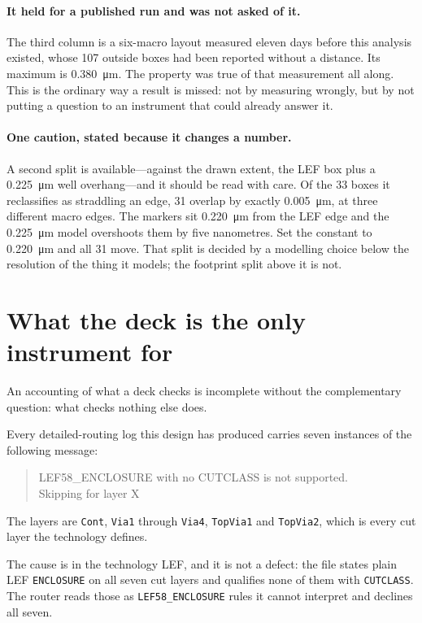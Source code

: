 \documentclass[11pt,a4paper]{article}
\begin{document}
\paragraph{It held for a published run and was not asked of it.} The
third column is a six-macro layout measured eleven days before this
analysis existed, whose \num{107} outside boxes had been reported without
a distance. Its maximum is \SI{0.380}{\um}. The property was
true of that measurement all along. This is the ordinary way a result is
missed: not by measuring wrongly, but by not putting a question to an
instrument that could already answer it.

\paragraph{One caution, stated because it changes a number.} A second
split is available---against the drawn extent, the LEF box plus a
\SI{0.225}{\um} well overhang---and it should be read with care.
Of the \num{33} boxes it reclassifies as straddling an edge, \num{31}
overlap by exactly \SI{0.005}{\um}, at three different macro
edges. The markers sit \SI{0.220}{\um} from the LEF edge and the
\SI{0.225}{\um} model overshoots them by five nanometres. Set
the constant to \SI{0.220}{\um} and all \num{31} move. That
split is decided by a modelling choice below the resolution of the thing
it models; the footprint split above it is not.

\section{What the deck is the only instrument for}
\label{sec:router}

An accounting of what a deck checks is incomplete without the
complementary question: what checks nothing else does.

Every detailed-routing log this design has produced carries seven
instances of the following message:
\begin{quote}\small\ttfamily
[DRT-0349] LEF58\_ENCLOSURE with no CUTCLASS is not supported.\\
Skipping for layer X
\end{quote}
The layers are \texttt{Cont}, \texttt{Via1} through
\texttt{Via4}, \texttt{TopVia1} and \texttt{TopVia2}, which is every cut
layer the technology defines.

The cause is in the technology LEF, and it is not a defect: the file
states plain LEF \texttt{ENCLOSURE} on all seven cut layers and qualifies
none of them with \texttt{CUTCLASS}. The router reads those as
\texttt{LEF58\_ENCLOSURE} rules it cannot interpret and declines all
seven.
\end{document}
